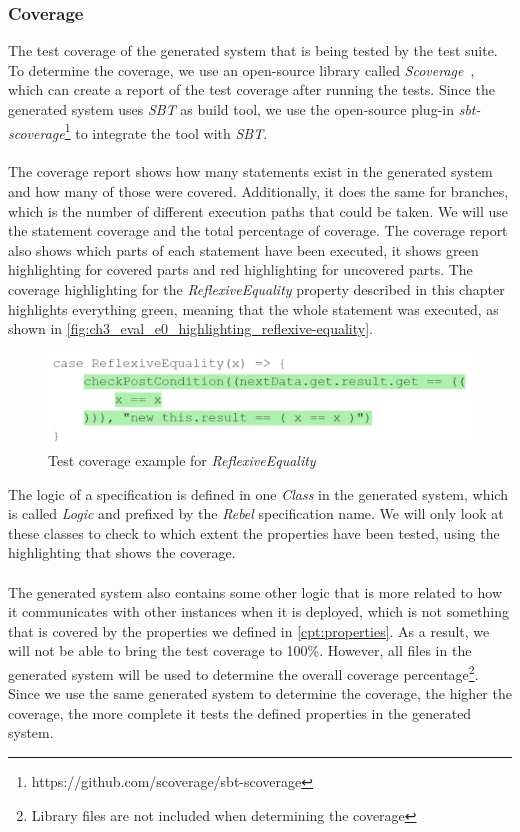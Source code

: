 \subsubsection{Coverage}
The test coverage of the generated system that is being tested by the test
suite. To determine the coverage, we use an open-source library called
\textit{Scoverage}~\cite{siteScoverage2017}, which can create a report of the
test coverage after running the tests. Since the generated system uses
\textit{SBT} as build tool, we use the open-source plug-in
\textit{sbt-scoverage}\footnote{https://github.com/scoverage/sbt-scoverage} to
integrate the tool with \textit{SBT}.\\
\\
The coverage report shows how many statements exist in the generated system and
how many of those were covered. Additionally, it does the same for branches,
which is the number of different execution paths that could be taken. We will
use the statement coverage and the total percentage
of coverage. The coverage report also shows which parts of each statement have
been executed, it shows green highlighting for covered parts and red
highlighting for uncovered parts. The coverage highlighting for the
\textit{ReflexiveEquality} property described in this chapter highlights
everything green, meaning that the whole statement was executed, as shown in
\autoref{fig:ch3_eval_e0_highlighting_reflexive-equality}.
\begin{figure}[!ht]
	\includegraphics[width=\linewidth]{figures/e0_coverage_property_sample}
\caption{Test coverage example for \textit{ReflexiveEquality}}
\label{fig:ch3_eval_e0_highlighting_reflexive-equality}
\centering
\end{figure}
\FloatBarrier\noindent
The logic of a specification is defined in one \textit{Class} in the generated
system, which is called \textit{Logic} and prefixed by the \textit{Rebel}
specification name. We will only look at these classes to check to which extent
the properties have been tested, using the highlighting that shows the
coverage.\\
\\
The generated system also contains some other logic that is more related to how
it communicates with other instances when it is deployed, which is not something
that is covered by the properties we defined in \autoref{cpt:properties}. As a
result, we will not be able to bring the test coverage to 100\%. However, all
files in the generated system will be used to determine the overall coverage
percentage\footnote{Library files are not included when determining the coverage}.
Since we use the same generated system to determine the coverage, the higher the
coverage, the more complete it tests the defined properties in the generated
system.

